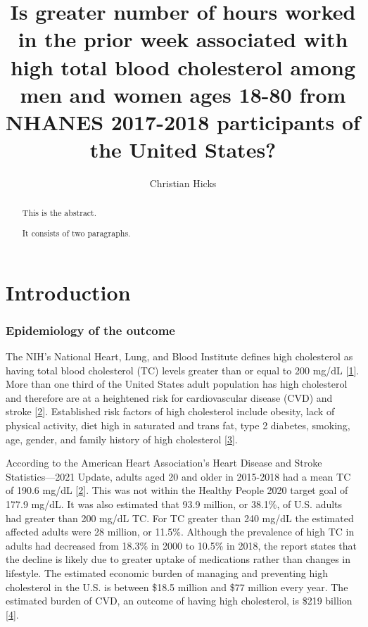 \documentclass[]{elsarticle} %
\begin{document}
\begin{frontmatter}

  \title{Is greater number of hours worked in the prior week associated
with high total blood cholesterol among men and women ages 18-80 from
NHANES 2017-2018 participants of the United States?}
    \author[San Diego State University School of Public
Health]{Christian Hicks}
      
  \begin{abstract}
  This is the abstract.

  It consists of two paragraphs.
  \end{abstract}
  
 \end{frontmatter}

\hypertarget{introduction}{%
\section{Introduction}\label{introduction}}

\hypertarget{epidemiology-of-the-outcome}{%
\subsubsection{Epidemiology of the
outcome}\label{epidemiology-of-the-outcome}}

The NIH's National Heart, Lung, and Blood Institute defines high
cholesterol as having total blood cholesterol (TC) levels greater than
or equal to 200 mg/dL {[}\protect\hyperlink{ref-nhlbi2001}{1}{]}. More
than one third of the United States adult population has high
cholesterol and therefore are at a heightened risk for cardiovascular
disease (CVD) and stroke {[}\protect\hyperlink{ref-virani2021}{2}{]}.
Established risk factors of high cholesterol include obesity, lack of
physical activity, diet high in saturated and trans fat, type 2
diabetes, smoking, age, gender, and family history of high cholesterol
{[}\protect\hyperlink{ref-cdc2020}{3}{]}.

According to the American Heart Association's Heart Disease and Stroke
Statistics---2021 Update, adults aged 20 and older in 2015-2018 had a
mean TC of 190.6 mg/dL {[}\protect\hyperlink{ref-virani2021}{2}{]}. This
was not within the Healthy People 2020 target goal of 177.9 mg/dL. It
was also estimated that 93.9 million, or 38.1\%, of U.S. adults had
greater than 200 mg/dL TC. For TC greater than 240 mg/dL the estimated
affected adults were 28 million, or 11.5\%. Although the prevalence of
high TC in adults had decreased from 18.3\% in 2000 to 10.5\% in 2018,
the report states that the decline is likely due to greater uptake of
medications rather than changes in lifestyle. The estimated economic
burden of managing and preventing high cholesterol in the U.S. is
between \$18.5 million and \$77 million every year. The estimated burden
of CVD, an outcome of having high cholesterol, is \$219 billion
{[}\protect\hyperlink{ref-ferrara2021}{4}{]}.
\end{document}

